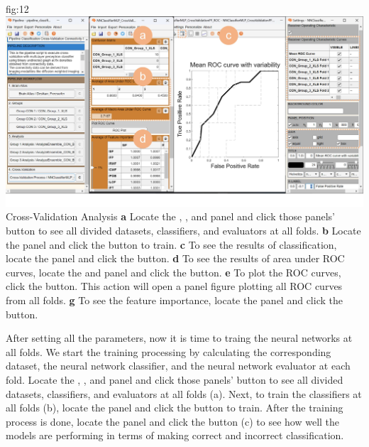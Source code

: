 \documentclass[justified]{tufte-handout}
\begin{document}
{
	{fig:12}
	{
	\includegraphics{fig12.jpg}
	}
	{Cross-Validation Analysis}
	{
	{\bf a} Locate the , , and  panel and click those panels'  button to see all divided datasets, classifiers, and evaluators at all folds.
	{\bf b} Locate the  panel and click the  button to train. 
	{\bf c} To see the results of classification, locate the  panel and click the  button. 
	{\bf d} To see the results of area under ROC curves, locate the  and  panel and click the  button.
	{\bf e} To plot the ROC curves, click the  button. This action will open a panel figure plotting all ROC curves from all folds.
	{\bf g} To see the feature importance, locate the  panel and click the  button. 
	}

After setting all the parameters, now it is time to traing the neural networks at all folds. 
We start the training processing by calculating the corresponding dataset, the neural network classifier, and the neural network evaluator at each fold.
Locate the , , and  panel and click those panels'  button to see all divided datasets, classifiers, and evaluators at all folds (a).
Next, to train the classifiers at all folds (b), locate the  panel and click the  button to train. 
After the training process is done, locate the  panel and click the  button (c) to see how well the models are performing in terms of making correct and incorrect classification.

}
\end{document}
